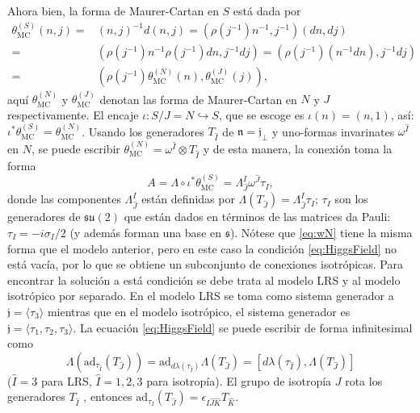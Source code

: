 Ahora bien, la forma de Maurer-Cartan en $S$ est\'{a} dada por
%
\begin{align*}
\label{eq:MC-S}
\theta^{(S)}_{\mathrm{MC}} (n, j) = & (n, j)^{-1} d(n, j) = (\rho(j^{-1}) n^{-1}, j^{-1}) (dn, dj) \\
= & (\rho(j^{-1}) n^{-1} \rho(j^{-1}) dn, j^{-1} dj) = (\rho(j^{-1}) (n^{-1} dn), j^{-1} dj) \\
= & \left(\rho(j^{-1}) \theta^{(N)}_{\mathrm{MC}} (n), \theta^{(J)}_{\mathrm{MC}} (j) \right),
\end{align*}
%
aqu\'{i} $\theta^{(N)}_{\mathrm{MC}}$ y $\theta^{(J)}_{\mathrm{MC}}$ denotan las forma de Maurer-Cartan en $N$ y $J$ respectivamente. El encaje $\iota: S/J = N \hookrightarrow S$, que se escoge es $\iota(n) = (n, 1)$, as\'{i}: $\iota^{*} \theta^{(S)}_{\mathrm{MC}} = \theta^{(N)}_{\mathrm{MC}}$. Usando los generadores $T_{\hat{I}}$ de $\mathfrak{n} = \mathfrak{j}_{\perp}$ y uno-formas invarinates $\omega^{\hat{I}}$ en $N$, se puede escribir $\theta^{(N)}_{\mathrm{MC}} = \omega^{\hat{I}} \otimes T_{\hat{I}}$ y de esta manera, la conexi\'{o}n toma la forma
%
\begin{equation}
\label{eq:wN}
A = \Lambda \circ \iota^{*} \theta^{(S)}_{\mathrm{MC}} = \Lambda^{I}_{\hat{J}} \omega^{\hat{J}} \tau_{I},
\end{equation}
%
donde las componentes $\Lambda^{I}_{\hat{J}}$ est\'{a}n definidas por $\Lambda(T_{\hat{J}}) = \Lambda^{I}_{\hat{J}} \tau_{I}$; $\tau_{I}$ son los generadores de $\mathfrak{su} (2)$ que est\'{a}n dados en t\'{e}rminos de las matrices da Pauli: $\tau_{I} = -i \sigma_{I}/2$ (y adem\'{a}s forman una base en $\mathfrak{s}$). N\'{o}tese que \eqref{eq:wN} tiene la misma forma que el modelo anterior, pero en este caso la condici\'{o}n \eqref{eq:HiggsField} no est\'{a} vac\'{i}a, por lo que se obtiene un subconjunto de conexiones isotr\'{o}picas. Para encontrar la soluci\'{o}n a est\'{a} condici\'{o}n se debe trata al modelo LRS y al modelo isotr\'{o}pico por separado. En el modelo LRS se toma como sistema generador a $\mathfrak{j} = \langle \tau_{3} \rangle$ mientras que en el modelo isotr\'{o}pico, el sistema generador es $\mathfrak{j} = \langle \tau_{1}, \tau_{2}, \tau_{3} \rangle$. La ecuaci\'{o}n \eqref{eq:HiggsField} se puede escribir de forma infinitesimal como
%
\begin{equation*}
\Lambda (\mathrm{ad}_{\tau_{\hat{I}}} (T_{\hat{J}})) = \mathrm{ad}_{d \lambda (\tau_{\hat{I}})} \Lambda (T_{\hat{J}}) = [d \lambda (\tau_{\hat{I}}), \Lambda (T_{\hat{J}})]
\end{equation*}
%
($\hat{I} = 3$ para LRS, $\hat{I} = 1,2,3$ para isotrop\'{i}a). El grupo de isotrop\'{i}a $J$ rota los generadores $T_{\hat{I}}$ \cite{Bojowald2000, Bojowald2005}, entonces $\mathrm{ad}_{\tau_{I}} (T_{\hat{J}}) = \epsilon_{I \hat{J} \hat{K}} T_{\hat{K}}$.

